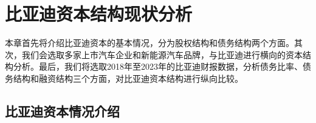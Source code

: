 \chapter{比亚迪资本结构现状分析}
本章首先将介绍比亚迪资本的基本情况，分为股权结构和债务结构两个方面。其次，我们会选取多家上市汽车企业和新能源汽车品牌，与比亚迪进行横向的资本结构分析。最后，我们将选取2018年至2023年的比亚迪财报数据，分析债务比率、债务结构和融资结构三个方面，对比亚迪资本结构进行纵向比较。
\section{比亚迪资本情况介绍}
